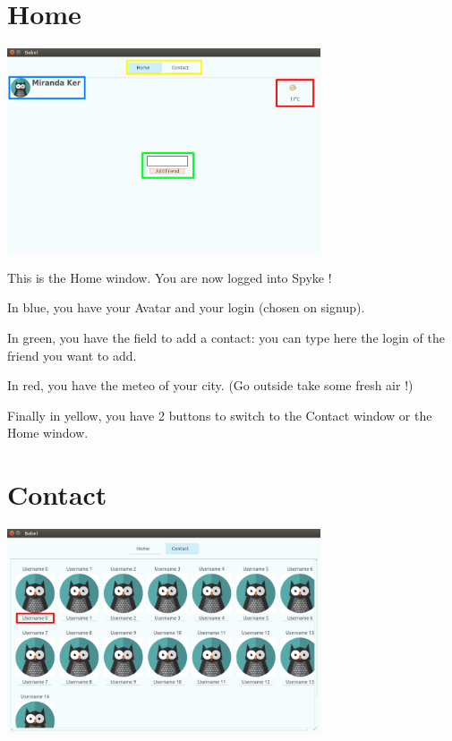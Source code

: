 \documentclass{article}
\begin{document}
  \newpage
  \section{Home}
  \bigskip
  \includegraphics[width=350]{homeGuide}

  \bigskip
  This is the Home window. You are now logged into Spyke !

  \bigskip
  In blue, you have your Avatar and your login (chosen on signup).

  \bigskip
  In green, you have the field to add a contact: you can type here the login of the friend you want to add.

  \bigskip
  In red, you have the meteo of your city. (Go outside take some fresh air !)

  \bigskip
  Finally in yellow, you have 2 buttons to switch to the Contact window or the Home window.

  \newpage
  \section{Contact}
  \bigskip
  \includegraphics[width=350]{contactGuide}
\end{document}
